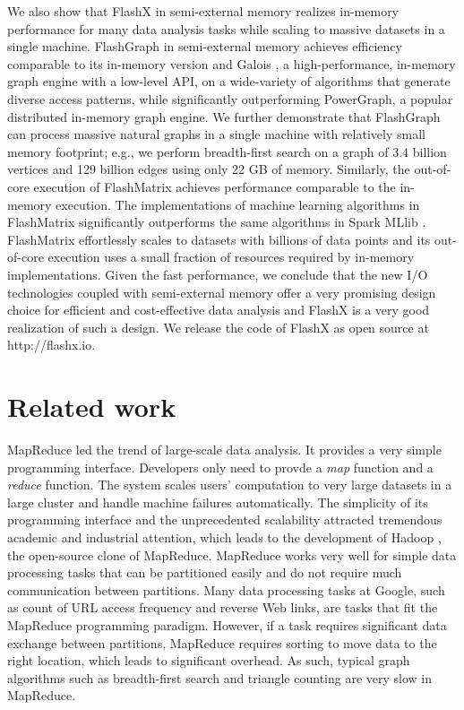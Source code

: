 We also show that FlashX in semi-external memory realizes
in-memory performance for many data analysis tasks while scaling to massive
datasets in a single machine. FlashGraph in semi-external memory achieves
efficiency comparable to its in-memory version and Galois \cite{galois},
a high-performance, in-memory graph engine with a low-level API, on
a wide-variety of algorithms that generate diverse access patterns, while
significantly outperforming PowerGraph, a popular distributed in-memory
graph engine. We further demonstrate that FlashGraph can process massive
natural graphs in a single machine with relatively small memory footprint;
e.g., we perform breadth-first search on a graph of 3.4 billion vertices
and 129 billion edges using only 22 GB of memory. Similarly, the out-of-core
execution of FlashMatrix achieves performance comparable to the in-memory
execution. The implementations of machine learning algorithms in FlashMatrix
significantly outperforms the same algorithms in Spark MLlib \cite{mllib}.
FlashMatrix effortlessly scales to datasets with billions of data points and
its out-of-core execution uses a small fraction of resources required by
in-memory implementations. Given the fast performance, we conclude that
the new I/O technologies coupled with semi-external memory offer a very
promising design choice for efficient and cost-effective data analysis and
FlashX is a very good realization of such a design. We release the code of
FlashX as open source at http://flashx.io.

\section{Related work}
MapReduce \cite{mapreduce} led the trend of large-scale data analysis. It
provides a very simple programming interface. Developers only need to provde
a \textit{map} function and
a \textit{reduce} function. The system scales users' computation to very large
datasets in a large cluster and handle machine failures automatically.
The simplicity of its programming interface and the unprecedented scalability
attracted tremendous academic and industrial attention, which leads to
the development of Hadoop \cite{hadoop}, the open-source clone of MapReduce.
MapReduce works very well for simple data processing tasks that can be
partitioned easily and do not require much communication between partitions.
Many data processing tasks at Google, such as count of URL access frequency
and reverse Web links, are tasks that fit the MapReduce programming paradigm.
However, if a task requires significant data exchange between partitions,
MapReduce requires sorting to move data to the right location, which leads
to significant overhead. As such, typical graph algorithms such as breadth-first
search and triangle counting are very slow in MapReduce.

